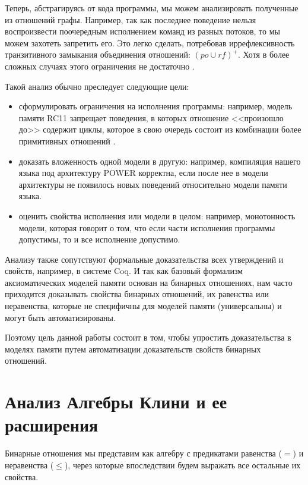 \documentclass[times
              ,specification
              ,annotation
              ]{itmo-student-thesis}
\begin{document}
  Теперь, абстрагируясь от кода программы, мы можем анализировать полученные из отношений
  графы. Например, так как последнее поведение нельзя воспроизвести поочередным исполнением команд из
  разных потоков, то мы можем захотеть запретить его.
  Это легко сделать, потребовав иррефлексивность транзитивного замыкания
  объединения отношений: $ (\textit{po} \cup \textit{rf})^+ $.
  Хотя в более сложных случаях этого ограничения не достаточно \cite{rc11}.

  Такой анализ обычно преследует следующие цели:
  \begin{itemize}
    \item сформулировать ограничения на исполнения программы:
    например, модель памяти RC11 запрещает поведения, в которых отношение <<произошло до>> содержит
    циклы, которое в свою очередь состоит из комбинации более примитивных отношений \cite{rc11}.
    \item доказать вложенность одной модели в другую:
    например, компиляция нашего языка под архитектуру POWER корректна, если после нее в модели
    архитектуры \cite{axiomatic_memory_model_for_power_mp} не появилось новых поведений относительно
    модели памяти языка.
    \item оценить свойства исполнения или модели в целом:
    например, монотонность модели, которая говорит о том, что если части исполнения программы
    допустимы, то и все исполнение допустимо.

  \end{itemize}

  Анализу также сопутствуют формальные доказательства всех утверждений и свойств, например, в системе Coq.
  И так как базовый формализм аксиоматических моделей памяти основан на бинарных отношениях, нам часто
  приходится доказывать свойства бинарных отношений, их равенства или неравенства, которые не
  специфичны для моделей памяти (универсальны) и могут быть автоматизированы.

  Поэтому цель данной работы состоит в том, чтобы упростить доказательства в моделях памяти путем
  автоматизации доказательств свойств бинарных отношений.

  \section{Анализ Алгебры Клини и ее расширения}

    Бинарные отношения мы представим как алгебру с предикатами равенства ($ = $) и неравенства ($ \leq $),
    через которые впоследствии будем выражать все остальные их свойства.
\end{document}
